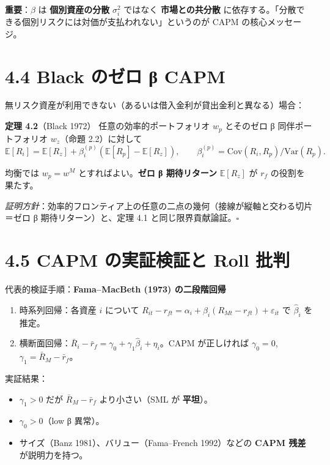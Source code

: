 \documentclass[11pt,a4paper]{report}
\begin{document}
\textbf{重要}：$\beta$ は \textbf{個別資産の分散} $\sigma_i^2$ ではなく \textbf{市場との共分散} に依存する。「分散できる個別リスクには対価が支払われない」というのが CAPM の核心メッセージ。

\section{4.4 Black のゼロ β CAPM}

無リスク資産が利用できない（あるいは借入金利が貸出金利と異なる）場合：

\textbf{定理 4.2}（Black 1972） 任意の効率的ポートフォリオ $w_p$ とそのゼロ β 同伴ポートフォリオ $w_z$（命題 2.2）に対して \[ \mathbb{E}[R_i] = \mathbb{E}[R_z] + \beta_i^{(p)} (\mathbb{E}[R_p] - \mathbb{E}[R_z]),\qquad \beta_i^{(p)} = \mathrm{Cov}(R_i, R_p)/\mathrm{Var}(R_p). \]

均衡では $w_p = w^M$ とすればよい。\textbf{ゼロ β 期待リターン} $\mathbb{E}[R_z]$ が $r_f$ の役割を果たす。

\emph{証明方針}：効率的フロンティア上の任意の二点の幾何（接線が縦軸と交わる切片＝ゼロ β 期待リターン）と、定理 4.1 と同じ限界貢献論証。$\square$

\section{4.5 CAPM の実証検証と Roll 批判}

代表的検証手順：\textbf{Fama–MacBeth (1973) の二段階回帰}

\begin{enumerate}
\item 時系列回帰：各資産 $i$ について $R_{it} - r_{ft} = \alpha_i + \beta_i (R_{Mt} - r_{ft}) + \varepsilon_{it}$ で $\hat\beta_i$ を推定。
\item 横断面回帰：$\bar R_i - \bar r_f = \gamma_0 + \gamma_1 \hat\beta_i + \eta_i$。CAPM が正しければ $\gamma_0 = 0$, $\gamma_1 = \bar R_M - \bar r_f$。
\end{enumerate}

実証結果：
\begin{itemize}
\item $\gamma_1 > 0$ だが $\bar R_M - \bar r_f$ より小さい（SML が \textbf{平坦}）。
\item $\gamma_0 > 0$（low β 異常）。
\item サイズ（Banz 1981）、バリュー（Fama–French 1992）などの \textbf{CAPM 残差} が説明力を持つ。
\end{itemize}
\end{document}
